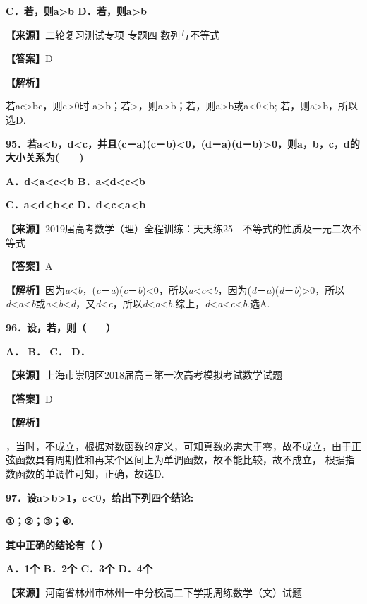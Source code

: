 \documentclass[
]{article}
\begin{document}
\textbf{C．若，则a\textgreater b D．若，则a\textgreater b}

\textbf{【来源】}二轮复习测试专项 专题四 数列与不等式

\textbf{【答案】}D

\textbf{【解析】}

若ac\textgreater bc，则c\textgreater0时
a\textgreater b；若\textgreater，则\textbar a\textbar\textgreater\textbar b\textbar；若，则a\textgreater b或a\textless0\textless b;
若，则a\textgreater b，所以选D.

\textbf{95．若a\textless b，d\textless c，并且(c－a)(c－b)\textless0，(d－a)(d－b)\textgreater0，则a，b，c，d的大小关系为(　　)}

\textbf{A．d\textless a\textless c\textless b
B．a\textless d\textless c\textless b}

\textbf{C．a\textless d\textless b\textless c
D．d\textless c\textless a\textless b}

\textbf{【来源】}2019届高考数学（理）全程训练：天天练25　不等式的性质及一元二次不等式

\textbf{【答案】}A

\textbf{【解析】}因为\emph{a}\textless{}\emph{b}，(\emph{c}－\emph{a})(\emph{c}－\emph{b})\textless0，所以\emph{a}\textless{}\emph{c}\textless{}\emph{b}，因为(\emph{d}－\emph{a})(\emph{d}－\emph{b})\textgreater0，所以\emph{d}\textless{}\emph{a}\textless{}\emph{b}或\emph{a}\textless{}\emph{b}\textless{}\emph{d}，又\emph{d}\textless{}\emph{c}，所以\emph{d}\textless{}\emph{a}\textless{}\emph{b}.综上，\emph{d}\textless{}\emph{a}\textless{}\emph{c}\textless{}\emph{b}.选A.

\textbf{96．设，若，则（　　）}

\textbf{A． B． C． D．}

\textbf{【来源】}上海市崇明区2018届高三第一次高考模拟考试数学试题

\textbf{【答案】}D

\textbf{【解析】}

，当时，不成立，根据对数函数的定义，可知真数必需大于零，故不成立，由于正弦函数具有周期性和再某个区间上为单调函数，故不能比较，故不成立，
根据指数函数的单调性可知，正确，故选D.

\textbf{97．设a\textgreater b\textgreater1，c\textless0，给出下列四个结论:}

\textbf{①；②；③；④.}

\textbf{其中正确的结论有（ ）}

\textbf{A．1个 B．2个 C．3个 D．4个}

\textbf{【来源】}河南省林州市林州一中分校高二下学期周练数学（文）试题
\end{document}
